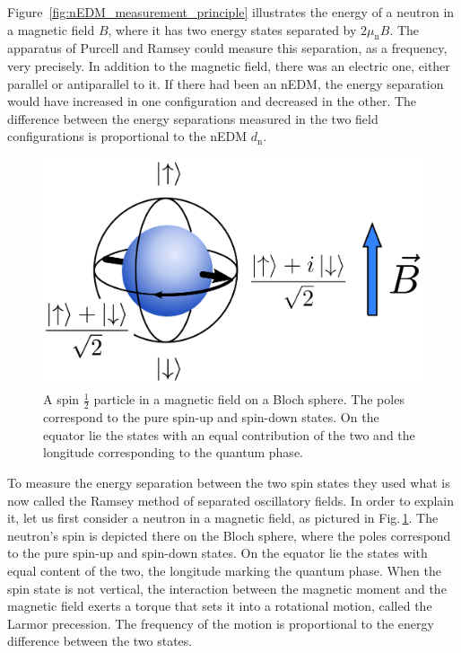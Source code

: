 Figure~\ref{fig:nEDM_measurement_principle} illustrates the energy of a neutron in a magnetic field $B$, where it has two energy states separated by $2 \mu_\text{n} B$. The apparatus of Purcell and Ramsey could measure this separation, as a frequency, very precisely. In addition to the magnetic field, there was an electric one, either parallel or antiparallel to it. If there had been an nEDM, the energy separation would have increased in one configuration and decreased in the other. The difference between the energy separations measured in the two field configurations is proportional to the nEDM $d_\text{n}$.

\begin{figure}
  \centering
  \includegraphics[width=.6\linewidth]{gfx/nEDMatPSI/bloch_sphere.png}
  \caption{A spin $\tfrac{1}{2}$ particle in a magnetic field on a Bloch sphere. The poles correspond to the pure spin-up and spin-down states. On the equator lie the states with an equal contribution of the two and the longitude corresponding to the quantum phase.}\label{fig:nEDM_bloch_sphere}
\end{figure}

To measure the energy separation between the two spin states they used what is now called the Ramsey method of separated oscillatory fields. In order to explain it, let us first consider a neutron in a magnetic field, as pictured in Fig.\,\ref{fig:nEDM_bloch_sphere}. The neutron's spin is depicted there on the Bloch sphere, where the poles correspond to the pure spin-up and spin-down states. On the equator lie the states with equal content of the two, the longitude marking the quantum phase. When the spin state is not vertical, the interaction between the magnetic moment and the magnetic field exerts a torque that sets it into a rotational motion, called the Larmor precession. The frequency of the motion is proportional to the energy difference between the two states.

